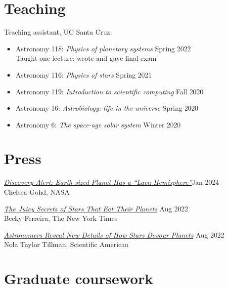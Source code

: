\documentclass{cv}
\begin{document}
\section*{Teaching}
Teaching assistant, UC Santa Cruz:
\begin{itemize}[item-vspace=0pt,begin-vspace=0pt,left-margin=1.7em]
\item Astronomy 118: \textit{Physics of planetary systems} \hfill Spring 2022\\Taught one lecture; wrote and gave final exam
\item Astronomy 116: \textit{Physics of stars} \hfill Spring 2021
\item Astronomy 119: \textit{Introduction to scientific computing} \hfill Fall 2020
\item Astronomy 16: \textit{Astrobiology: life in the universe} \hfill Spring 2020
\item Astronomy 6: \textit{The space-age solar system} \hfill Winter 2020
\end{itemize}

\ifdefined\withpress{}
\section*{Press}
\href{https://science.nasa.gov/universe/exoplanets/discovery-alert-earth-sized-planet-has-a-lava-hemisphere/}{\textit{Discovery Alert: Earth-sized Planet Has a ``Lava Hemisphere''}}\hfill Jan 2024\\
Chelsea Gohd, NASA

\href{https://www.nytimes.com/2022/08/19/science/stars-planets-engulfment.html}{\textit{The Juicy Secrets of Stars That Eat Their Planets}} \hfill Aug 2022\\
Becky Ferreira, The New York Times

\href{https://www.scientificamerican.com/article/astronomers-reveal-new-details-of-how-stars-devour-planets/}{\textit{Astronomers Reveal New Details of How Stars Devour Planets}} \hfill Aug 2022\\
Nola Taylor Tillman, Scientific American

\else\fi

\ifdefined\withcourses{}
\section*{Graduate coursework}
\end{document}
